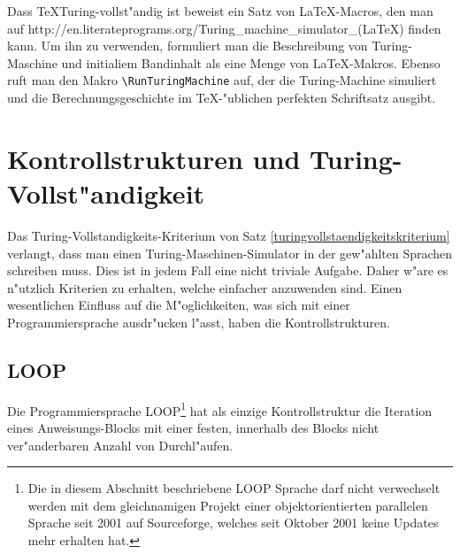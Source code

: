 Dass \TeX Turing-vollst"andig ist beweist ein Satz von \LaTeX-Macros, den
man auf
http://en.literateprograms.org/Turing\_machine\_simulator\_(LaTeX)
finden kann.
Um ihn zu verwenden, formuliert man die Beschreibung
von Turing-Maschine und initialiem Bandinhalt als eine Menge von
\LaTeX-Makros. Ebenso ruft man den Makro \verb+\RunTuringMachine+ auf,
der die Turing-Machine simuliert und die Berechnungsgeschichte im
\TeX-"ublichen perfekten Schriftsatz ausgibt.



\section{Kontrollstrukturen und Turing-Vollst"andigkeit}
Das Turing-Vollstandigkeits-Kriterium von Satz
\ref{turingvollstaendigkeitskriterium} verlangt, dass man einen
Turing-Maschinen-Simulator in der gew"ahlten Sprachen schreiben muss.
Dies ist in jedem Fall eine nicht triviale Aufgabe.
Daher w"are es n"utzlich Kriterien zu erhalten, welche einfacher
anzuwenden sind. Einen wesentlichen Einfluss auf die M"oglichkeiten,
was sich mit einer Programmiersprache ausdr"ucken l"asst, haben die
Kontrollstrukturen.

\subsection{LOOP}
Die Programmiersprache
LOOP\footnote{Die in diesem Abschnitt beschriebene
LOOP Sprache darf nicht verwechselt werden mit dem gleichnamigen
Projekt einer objektorientierten parallelen Sprache seit
2001 auf Sourceforge, welches seit Oktober 2001 keine Updates mehr
erhalten hat.}
hat als einzige Kontrollstruktur die
Iteration eines Anweisungs-Blocks mit einer festen, innerhalb des
Blocks nicht ver"anderbaren Anzahl von Durchl"aufen.

